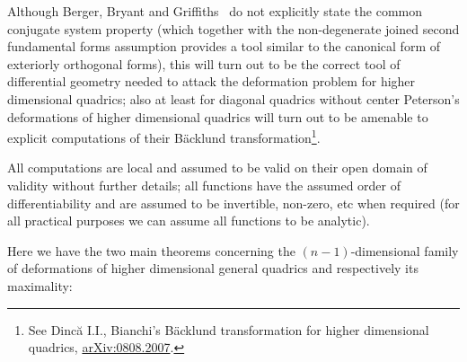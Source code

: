 Although Berger, Bryant and Grif\/f\/iths~\cite{B} do not explicitly
state the common conjugate system property (which together with
the non-degenerate joined second fundamental forms assumption
provides a tool similar to the canonical form of exteriorly
orthogonal forms), this will turn out to be the correct tool of
dif\/ferential geometry needed to attack the deformation problem for
higher dimensional quadrics; also at least for diagonal quadrics
without center Peterson's deformations of higher dimensional
quadrics will turn out to be amenable to explicit computations of
their B\"{a}cklund transformation\footnote{See Dinc\u{a} I.I., Bianchi's
B\"{a}cklund transformation for higher dimensional quadrics,
\href{http://arxiv.org/abs/0808.2007}{arXiv:0808.2007}.}.

All computations are local and assumed to be valid on their open
domain of validity without further details; all functions have the
assumed order of dif\/ferentiability and are assumed to be
invertible, non-zero, etc when required (for all practical
purposes we can assume all functions to be analytic).

Here we have the two main theorems concerning the
$(n-1)$-dimensional family of deformations of higher dimensional
general quadrics and respectively its maximality:

